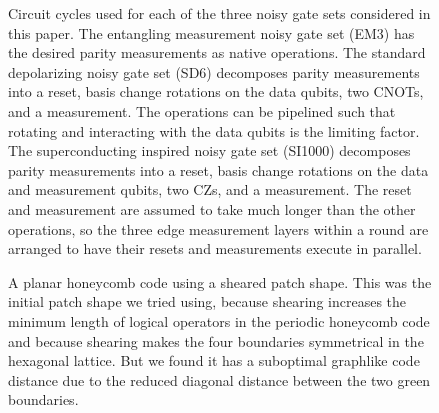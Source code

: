 \documentclass[onecolumn,a4paper,accepted=2022-09-12]{quantumarticle}
\theoremstyle{definition}
\theoremstyle{definition}
\theoremstyle{definition}
\begin{document}
\begin{figure}[h]
    \centering
    \caption{
    Circuit cycles used for each of the three noisy gate sets considered in this paper.
    The entangling measurement noisy gate set (EM3) has the desired parity measurements as native operations.
    The standard depolarizing noisy gate set (SD6) decomposes parity measurements into a reset, basis change rotations on the data qubits, two CNOTs, and a measurement.
    The operations can be pipelined such that rotating and interacting with the data qubits is the limiting factor.
    The superconducting inspired noisy gate set (SI1000) decomposes parity measurements into a reset, basis change rotations on the data and measurement qubits, two CZs, and a measurement.
    The reset and measurement are assumed to take much longer than the other operations, so the three edge measurement layers within a round are arranged to have their resets and measurements execute in parallel.
    }
    \label{fig:circuit_cycles}
\end{figure}

\begin{figure}[h]
    \centering
    \caption{
    A planar honeycomb code using a sheared patch shape.
    This was the initial patch shape we tried using, because shearing increases the minimum length of logical operators \cite{bombin2007optimal} in the periodic honeycomb code and because shearing makes the four boundaries symmetrical in the hexagonal lattice.
    But we found it has a suboptimal graphlike code distance due to the reduced diagonal distance between the two green boundaries.
    }
    \label{fig:sheared}
\end{figure}
\end{document}
